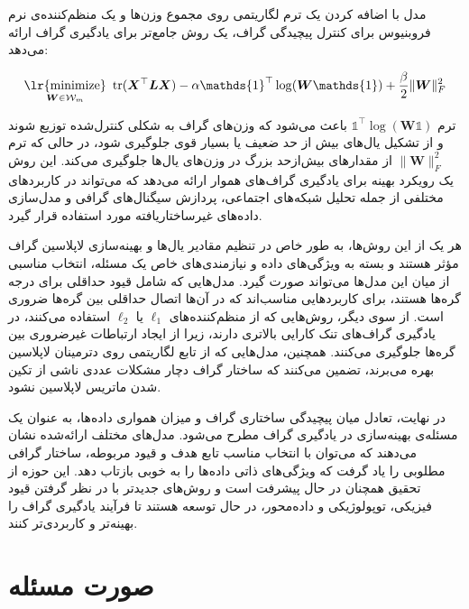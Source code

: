 \documentclass[10pt,twocolumn,a4paper]{article}
\newcommand\minimize[1]{\mathop{\text{\lr{minimize}}}\limits_{#1}\ }
\begin{document}
     مدل 
     \cite{Kalofolias2016}
     با اضافه کردن یک ترم لگاریتمی روی مجموع وزن‌ها و یک منظم‌کننده‌ی نرم فروبنیوس برای کنترل پیچیدگی گراف، یک روش جامع‌تر برای یادگیری گراف ارائه می‌دهد:
     
\begin{equation}
	    \minimize{\bm{W}\in\mathcal{W}_m} \text{tr} (\bm{X}^\top \bm{L} \bm{X}) - \alpha \mathds{1}^\top \log (\bm{W} \mathds{1}) + \frac{\beta}{2} \|\bm{W}\|_F^2
\end{equation}
     
     ترم \( \mathds{1}^\top \log (\bm{W} \mathds{1}) \) باعث می‌شود که وزن‌های گراف به شکلی کنترل‌شده توزیع شوند و از تشکیل یال‌های بیش از حد ضعیف یا بسیار قوی جلوگیری شود، در حالی که ترم \( \|\bm{W}\|_F^2 \) از مقدارهای بیش‌ازحد بزرگ در وزن‌های یال‌ها جلوگیری می‌کند. این روش یک رویکرد بهینه برای یادگیری گراف‌های هموار ارائه می‌دهد که می‌تواند در کاربردهای مختلفی از جمله تحلیل شبکه‌های اجتماعی، پردازش سیگنال‌های گرافی و مدل‌سازی داده‌های غیرساختاریافته مورد استفاده قرار گیرد.
     
     هر یک از این روش‌ها، به طور خاص در تنظیم مقادیر یال‌ها و بهینه‌سازی لاپلاسین گراف مؤثر هستند و بسته به ویژگی‌های داده و نیازمندی‌های خاص یک مسئله، انتخاب مناسبی از میان این مدل‌ها می‌تواند صورت گیرد. مدل‌هایی که شامل قیود حداقلی برای درجه گره‌ها هستند، برای کاربردهایی مناسب‌اند که در آن‌ها اتصال حداقلی بین گره‌ها ضروری است. از سوی دیگر، روش‌هایی که از منظم‌کننده‌های \(\ell_1\) یا \(\ell_2\) استفاده می‌کنند، در یادگیری گراف‌های تنک کارایی بالاتری دارند، زیرا از ایجاد ارتباطات غیرضروری بین گره‌ها جلوگیری می‌کنند. همچنین، مدل‌هایی که از تابع لگاریتمی روی دترمینان لاپلاسین بهره می‌برند، تضمین می‌کنند که ساختار گراف دچار مشکلات عددی ناشی از تکین شدن ماتریس لاپلاسین نشود.
     
     در نهایت، تعادل میان پیچیدگی ساختاری گراف و میزان همواری داده‌ها، به عنوان یک مسئله‌ی بهینه‌سازی در یادگیری گراف مطرح می‌شود. مدل‌های مختلف ارائه‌شده نشان می‌دهند که می‌توان با انتخاب مناسب تابع هدف و قیود مربوطه، ساختار گرافی مطلوبی را یاد گرفت که ویژگی‌های ذاتی داده‌ها را به خوبی بازتاب دهد. این حوزه از تحقیق همچنان در حال پیشرفت است و روش‌های جدیدتر با در نظر گرفتن قیود فیزیکی، توپولوژیکی و داده‌محور، در حال توسعه هستند تا فرآیند یادگیری گراف را بهینه‌تر و کاربردی‌تر کنند.
     


    \section{صورت مسئله}
    
\end{document}
